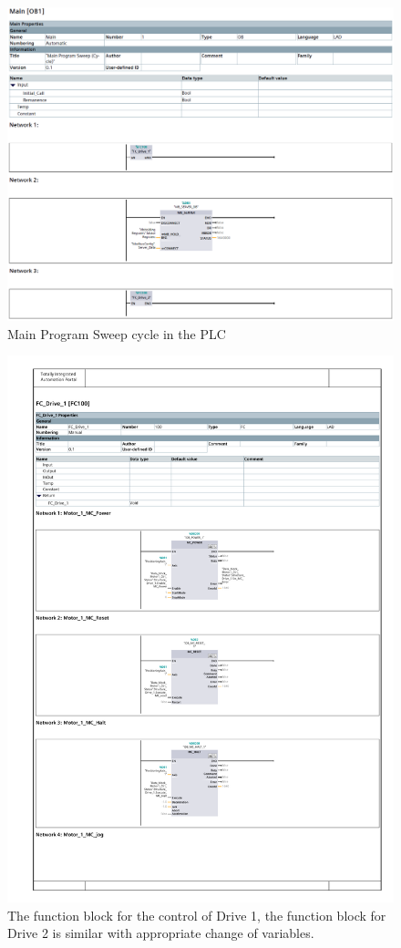 \begin{figure}[H]
    \centering
    \includegraphics[width=0.5\linewidth]{FBDs/MainProgramSweep.PNG}
    \caption{Main Program Sweep cycle in the PLC}
    \label{fig:OB1}
\end{figure}


\thispagestyle{empty}
{%
\begin{figure}[H]
    \centering
    \includegraphics[page=1,scale=.5]{FBDs/FC_1.pdf}
    \caption{The function block for the control of Drive 1, the function block for Drive 2 is similar with appropriate change of variables.}
    \label{fig:FC1}
\end{figure}
  \par
}

\restoregeometry

